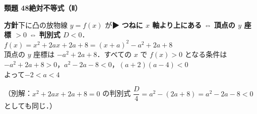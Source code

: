 \documentclass[a4paper,11pt]{ltjsarticle}
\newcommand{\ans}[2]{\Needspace{5\baselineskip}\vspace{6pt}%
  {\sffamily\bfseries 類題 #1\quad #2}\par}
\newcommand{\point}[1]{\textsf{\bfseries ▶ #1}}
\newcommand{\ax}[4]{\draw[->] (#1,0)--(#2,0) node[right]{\scriptsize $x$};
  \draw[->] (0,#3)--(0,#4) node[above]{\scriptsize $y$};
  \node[below left] at (0,0){\scriptsize O};}
\begin{document}
\ans{48}{絶対不等式（Ⅱ）}
\begin{kai}
\textbf{方針}\quad 下に凸の放物線 $y=f(x)$ が\point{つねに $x$ 軸より上にある ⇔ 頂点の $y$ 座標 $>0$ ⇔ 判別式 $D<0$}．\\[2pt]
$f(x)=x^2+2ax+2a+8=(x+a)^2-a^2+2a+8$\\
頂点の $y$ 座標は $-a^2+2a+8$．すべての $x$ で $f(x)>0$ となる条件は\\
\hspace*{1.5em}$-a^2+2a+8>0$，\quad $a^2-2a-8<0$，\quad $(a+2)(a-4)<0$\\
\hspace*{1.5em}よって\quad $-2<a<4$\\[2pt]
\begin{center}
\end{center}
（別解：$x^2+2ax+2a+8=0$ の判別式 $\dfrac D4=a^2-(2a+8)=a^2-2a-8<0$ としても同じ．）
\end{kai}
\end{document}
